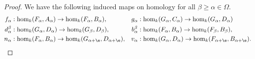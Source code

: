 \begin{proof}


  We have the following induced maps on homology for all $\beta\geq\alpha\in\Omega$.
  \begin{align*}
    f_\alpha &: \hom_k(F_\alpha, A_\alpha)\to \hom_k(F_\alpha, B_\alpha),& g_\alpha &: \hom_k(G_\alpha, C_\alpha)\to \hom_k(G_\alpha, D_\alpha)\\
    d_\alpha^\beta &: \hom_k(G_\alpha, D_\alpha)\to \hom_k(G_\beta, D_\beta),& b_\alpha^\beta &: \hom_k(F_\alpha, B_\alpha)\to \hom_k(F_\beta, B_\beta),\\
    n_\alpha &: \hom_k(F_\alpha, B_\alpha)\to \hom_k(G_{\alpha+\e}, D_{\alpha+\e}),& v_\alpha &:\hom_k(G_\alpha, D_\alpha)\to \hom_k(F_{\alpha+\e}, B_{\alpha+\e}).
  \end{align*}


\end{proof}

